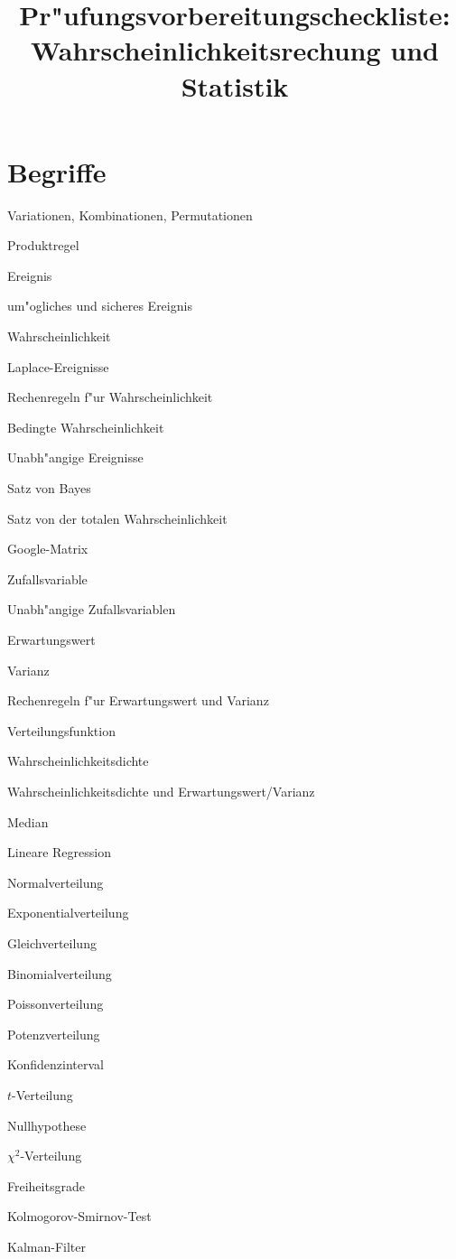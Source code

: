 \documentclass[a4paper,12pt,twocolumn]{article}
\begin{document}
\title{Pr"ufungsvorbereitungscheckliste:\\ Wahrscheinlichkeitsrechung und Statistik}
\date{}
\maketitle
\section{Begriffe}
\begin{compactenum}
\item Variationen, Kombinationen, Permutationen
\item Produktregel
\item Ereignis
\item um"ogliches und sicheres Ereignis
\item Wahrscheinlichkeit
\item Laplace-Ereignisse
\item Rechenregeln f"ur Wahrscheinlichkeit
\item Bedingte Wahrscheinlichkeit
\item Unabh"angige Ereignisse
\item Satz von Bayes
\item Satz von der totalen Wahrscheinlichkeit
\item Google-Matrix
\item Zufallsvariable
\item Unabh"angige Zufallsvariablen
\item Erwartungswert
\item Varianz
\item Rechenregeln f"ur Erwartungswert und Varianz
\item Verteilungsfunktion
\item Wahrscheinlichkeitsdichte
\item Wahrscheinlichkeitsdichte und Erwartungswert/Varianz
\item Median
\item Lineare Regression
\item Normalverteilung
\item Exponentialverteilung
\item Gleichverteilung
\item Binomialverteilung
\item Poissonverteilung
\item Potenzverteilung
\item Konfidenzinterval
\item $t$-Verteilung
\item Nullhypothese
\item $\chi^2$-Verteilung
\item Freiheitsgrade
\item Kolmogorov-Smirnov-Test
\item Kalman-Filter
\end{compactenum}
\vfill
\end{document}
